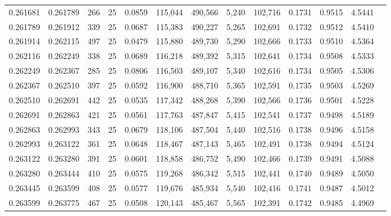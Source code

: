 \begin{tabular}{rrrrrrrrrrrrr}
0.261681 & 0.261789 &   266 &  25 &                                     0.0859 & 115,044 & 490,566 &   5,240 & 102,716 & 0.1731 & 0.9515 & 4.5441 \\
0.261789 & 0.261912 &   339 &  25 &                                     0.0687 & 115,383 & 490,227 &   5,265 & 102,691 & 0.1732 & 0.9512 & 4.5410 \\
0.261914 & 0.262115 &   497 &  25 &                                     0.0479 & 115,880 & 489,730 &   5,290 & 102,666 & 0.1733 & 0.9510 & 4.5364 \\
0.262116 & 0.262249 &   338 &  25 &                                     0.0689 & 116,218 & 489,392 &   5,315 & 102,641 & 0.1734 & 0.9508 & 4.5333 \\
0.262249 & 0.262367 &   285 &  25 &                                     0.0806 & 116,503 & 489,107 &   5,340 & 102,616 & 0.1734 & 0.9505 & 4.5306 \\
0.262367 & 0.262510 &   397 &  25 &                                     0.0592 & 116,900 & 488,710 &   5,365 & 102,591 & 0.1735 & 0.9503 & 4.5269 \\
0.262510 & 0.262691 &   442 &  25 &                                     0.0535 & 117,342 & 488,268 &   5,390 & 102,566 & 0.1736 & 0.9501 & 4.5228 \\
0.262691 & 0.262863 &   421 &  25 &                                     0.0561 & 117,763 & 487,847 &   5,415 & 102,541 & 0.1737 & 0.9498 & 4.5189 \\
0.262863 & 0.262993 &   343 &  25 &                                     0.0679 & 118,106 & 487,504 &   5,440 & 102,516 & 0.1738 & 0.9496 & 4.5158 \\
0.262993 & 0.263122 &   361 &  25 &                                     0.0648 & 118,467 & 487,143 &   5,465 & 102,491 & 0.1738 & 0.9494 & 4.5124 \\
0.263122 & 0.263280 &   391 &  25 &                                     0.0601 & 118,858 & 486,752 &   5,490 & 102,466 & 0.1739 & 0.9491 & 4.5088 \\
0.263280 & 0.263444 &   410 &  25 &                                     0.0575 & 119,268 & 486,342 &   5,515 & 102,441 & 0.1740 & 0.9489 & 4.5050 \\
0.263445 & 0.263599 &   408 &  25 &                                     0.0577 & 119,676 & 485,934 &   5,540 & 102,416 & 0.1741 & 0.9487 & 4.5012 \\
0.263599 & 0.263775 &   467 &  25 &                                     0.0508 & 120,143 & 485,467 &   5,565 & 102,391 & 0.1742 & 0.9485 & 4.4969 \\

\end{tabular}
